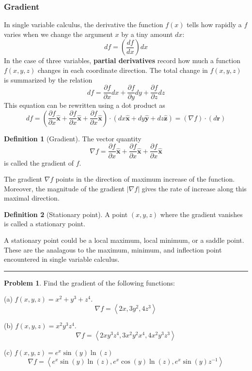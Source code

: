 \documentclass{article}
\theoremstyle{definition}
\newtheorem*{definition}{Definition}
\newtheorem{problem}{Problem}[section]
\theoremstyle{remark}
\newcommand{\pline}{\par\noindent\rule{\textwidth}{0.5pt}}
\newcommand{\abs}[1]{\left|#1\right|}
\newcommand{\components}[1]{\left\langle #1 \right\rangle}
\renewcommand{\vec}{\mathbf}
\newcommand{\xhat}{\hat{\vec{x}}}
\newcommand{\yhat}{\hat{\vec{y}}}
\newcommand{\zhat}{\hat{\vec{z}}}
\newcommand{\diff}[2]{\frac{\partial #1}{\partial #2}}
\newcommand{\grad}{\nabla}
\begin{document}
\subsubsection{Gradient}
In single variable calculus, the derivative the function $f(x)$ tells how rapidly a $f$ varies when we change the argument $x$ by a tiny amount $dx$:
\begin{equation}
df=\left(\frac{df}{dx}\right)dx
\end{equation}
In the case of three variables, \textbf{partial derivatives} record how much a function $f(x,y,z)$ changes in each coordinate direction. The total change in $f(x,y,z)$ is summarized by the relation 
\begin{equation}
df = \diff{f}{x}dx+\diff{f}{y}dy+\diff{f}{z}dz
\end{equation}
This equation can be rewritten using a dot product as 
\begin{equation}
df = \left(\diff{f}{x}\xhat+\diff{f}{x}\xhat+\diff{f}{x}\xhat\right) \cdot (dx\xhat+dy\yhat+dz\zhat) = (\grad f)\cdot (d\vec{r})
\end{equation}
\begin{definition}[Gradient]
The vector quantity
\begin{equation}
\grad f = \diff{f}{x}\xhat+\diff{f}{x}\xhat+\diff{f}{x}\xhat
\end{equation}
is called the gradient of $f$.
\end{definition}

\noindent The gradient $\grad f$ points in the direction of maximum increase of the function. Moreover, the magnitude of the gradient $\abs{\grad f}$ gives the rate of increase along this maximal direction.

\begin{definition}[Stationary point]
A point $(x,y,z)$ where the gradient vanishes is called a stationary point. 
\end{definition}

\noindent A stationary point could be a local maximum, local minimum, or a saddle point. These are the analagous to the maximum, minimum, and inflection point encountered in single variable calculus.

\pline
\begin{problem}
Find the gradient of the following functions:
\end{problem}
\begin{description}
\item{(a)} $f(x,y,z) = x^2+y^3+z^4$. \[\grad f = \components{2x,3y^2,4z^3}\]
\item{(b)} $f(x,y,z) = x^2y^3z^4$. \[\grad f=\components{2xy^3z^4,3x^2y^2x^4,4x^2y^3z^3}\]
\item{(c)} $f(x,y,z) = e^{x}\sin(y)\ln(z)$ \[\grad f=\components{e^{x}\sin(y)\ln(z),e^{x}\cos(y)\ln(z),e^{x}\sin(y)z^{-1}}\]
\end{description}
\end{document}
